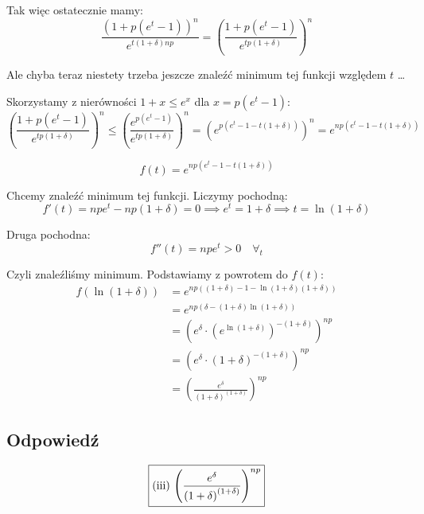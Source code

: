 Tak więc ostatecznie mamy:
\[
	\frac{\left(1 + p(e^t - 1)\right)^{n}}{e^{t(1 + \delta) np}} = \left(\frac{1 + p(e^t - 1)}{e^{tp(1 + \delta)}}\right)^n
\]

Ale chyba teraz niestety trzeba jeszcze znaleźć minimum tej funkcji względem \(t\) \dots

Skorzystamy z nierówności \(1 + x \le e^x\) dla \(x = p(e^t - 1)\):
\[
	\left(\frac{1 + p(e^t - 1)}{e^{tp(1 + \delta)}}\right)^n \le \left(\frac{e^{p(e^t - 1)}}{e^{tp(1 + \delta)}}\right)^n = \left(e^{p(e^t - 1 - t(1 + \delta))}\right)^n = e^{np(e^t - 1 - t(1 + \delta))}
\]

\[
	f(t) = e^{np(e^t - 1 - t(1 + \delta))}
\]

Chcemy znaleźć minimum tej funkcji. Liczymy pochodną:
\[
	f'(t) = np e^{t} - np(1 + \delta) = 0 \implies e^{t} = 1 + \delta \implies t = \ln(1 + \delta)
\]

Druga pochodna:
\[
	f''(t) = np e^{t} > 0 \quad \forall_{t}
\]

Czyli znaleźliśmy minimum. Podstawiamy z powrotem do \(f(t)\):
\begin{align*}
	f(\ln(1 + \delta)) & = e^{np((1 + \delta) - 1 - \ln(1 + \delta)(1 + \delta))}                              \\
	                   & = e^{np(\delta - (1 + \delta) \ln(1 + \delta))}                                       \\
	                   & = \left( e^{\delta} \cdot \left(e^{\ln(1+\delta)}\right)^{-(1 + \delta)} \right)^{np} \\
	                   & = \left( e^{\delta} \cdot \left(1+\delta\right)^{-(1 + \delta)} \right)^{np}          \\
	                   & = \left( \frac{e^{\delta}}{\left(1+\delta\right)^{(1 + \delta)}} \right)^{np}
\end{align*}

\subsection*{Odpowiedź}
\[
	\boxed{\text{(iii) \( \left( \frac{e^{\delta}}{\left(1+\delta\right)^{(1 + \delta)}} \right)^{np} \)}}
\]
